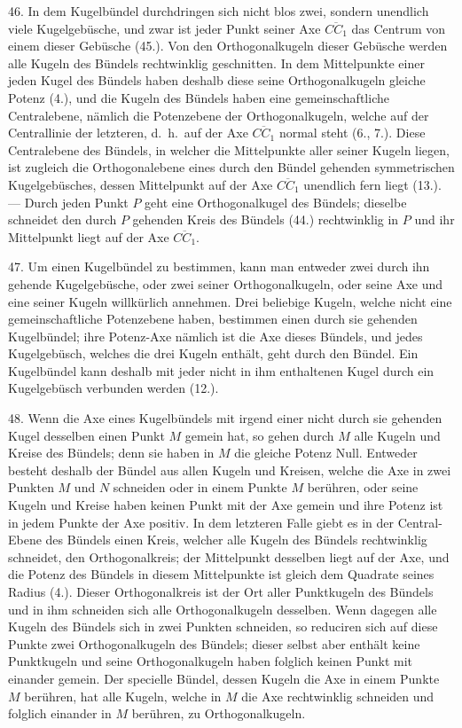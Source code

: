 46. In dem Kugelb\"undel durchdringen sich nicht blos
zwei, sondern unendlich viele Kugelgeb\"usche, und zwar ist
jeder Punkt seiner Axe $\overline{CC_1}$ das Centrum von einem dieser
Geb\"usche (45.). Von den Orthogonalkugeln dieser Geb\"usche
werden alle Kugeln des B\"undels rechtwinklig geschnitten.
In dem Mittelpunkte einer jeden Kugel des B\"undels haben
deshalb diese seine Orthogonalkugeln gleiche Potenz (4.),
und die Kugeln des B\"undels haben eine gemeinschaftliche
Centralebene, n\"amlich die Potenzebene der Orthogonalkugeln,
welche auf der Centrallinie der letzteren, d.~h.\ auf der Axe
$\overline{CC_1}$ normal steht (6., 7.). Diese Centralebene des B\"undels,
in welcher die Mittelpunkte aller seiner Kugeln liegen, ist
zugleich die Orthogonalebene eines durch den B\"undel gehenden
symmetrischen Kugelgeb\"usches, dessen Mittelpunkt
auf der Axe $\overline{CC_1}$ unendlich fern liegt (13.). --- Durch jeden
Punkt $P$ geht eine Orthogonalkugel des B\"undels; dieselbe
schneidet den durch $P$ gehenden Kreis des B\"undels (44.)
rechtwinklig in $P$ und ihr Mittelpunkt liegt auf der Axe $\overline{CC_1}$.

47. Um einen Kugelb\"undel zu bestimmen, kann man
entweder zwei durch ihn gehende Kugelgeb\"usche, oder zwei
seiner Orthogonalkugeln, oder seine Axe und eine seiner
Kugeln willk\"urlich annehmen. Drei beliebige Kugeln, welche
nicht eine gemeinschaftliche Potenzebene haben, bestimmen
einen durch sie gehenden Kugelb\"undel; ihre Potenz-Axe
n\"amlich ist die Axe dieses B\"undels, und jedes Kugelgeb\"usch,
welches die drei Kugeln enth\"alt, geht durch den B\"undel.
Ein Kugelb\"undel kann deshalb mit jeder nicht in ihm
enthaltenen Kugel durch ein Kugelgeb\"usch verbunden werden
(12.).

48. Wenn die Axe eines Kugelb\"undels mit irgend einer
nicht durch sie gehenden Kugel desselben einen Punkt $M$
gemein hat, so gehen durch $M$ alle Kugeln und Kreise des
B\"undels; denn sie haben in $M$ die gleiche Potenz Null. Entweder
besteht deshalb der B\"undel aus allen Kugeln und
Kreisen, welche die Axe in zwei Punkten $M$ und $N$ schneiden
oder in einem Punkte $M$ ber\"uhren, oder seine Kugeln
und Kreise haben keinen Punkt mit der Axe gemein und
ihre Potenz ist in jedem Punkte der Axe positiv. In dem
letzteren Falle giebt es in der Central-Ebene des B\"undels
einen Kreis, welcher alle Kugeln des B\"undels rechtwinklig
schneidet, den {\glqq}Orthogonalkreis{\grqq}; der Mittelpunkt desselben
liegt auf der Axe, und die Potenz des B\"undels in diesem
Mittelpunkte ist gleich dem Quadrate seines Radius (4.).
Dieser Orthogonalkreis ist der Ort aller Punktkugeln des
B\"undels und in ihm schneiden sich alle Orthogonalkugeln
desselben. Wenn dagegen alle Kugeln des B\"undels sich in
zwei Punkten schneiden, so reduciren sich auf diese Punkte
zwei Orthogonalkugeln des B\"undels; dieser selbst aber enth\"alt
keine Punktkugeln und seine Orthogonalkugeln haben
folglich keinen Punkt mit einander gemein. Der specielle
B\"undel, dessen Kugeln die Axe in einem Punkte $M$ ber\"uhren,
hat alle Kugeln, welche in $M$ die Axe rechtwinklig schneiden
und folglich einander in $M$ ber\"uhren, zu Orthogonalkugeln.

